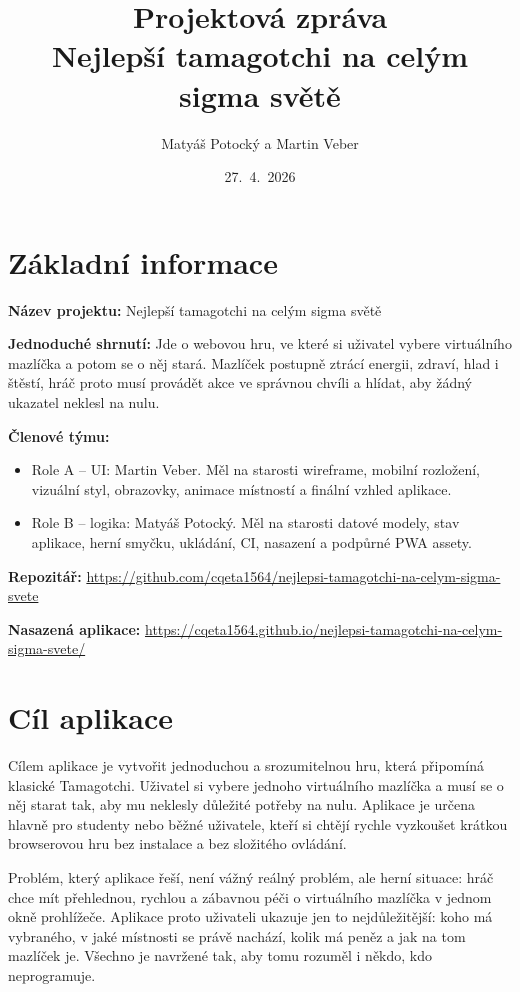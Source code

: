\documentclass[12pt,a4paper]{article}
\title{Projektová zpráva\\Nejlepší tamagotchi na celým sigma světě}
\author{Matyáš Potocký a Martin Veber}
\date{27.~4.~2026}
\begin{document}
\maketitle
\tableofcontents
\newpage

\section{Základní informace}

\textbf{Název projektu:} Nejlepší tamagotchi na celým sigma světě

\textbf{Jednoduché shrnutí:} Jde o webovou hru, ve které si uživatel vybere virtuálního mazlíčka a potom se o něj stará. Mazlíček postupně ztrácí energii, zdraví, hlad i štěstí, hráč proto musí provádět akce ve správnou chvíli a hlídat, aby žádný ukazatel neklesl na nulu.

\textbf{Členové týmu:}
\begin{itemize}[leftmargin=2em]
  \item Role A -- UI: Martin Veber. Měl na starosti wireframe, mobilní rozložení, vizuální styl, obrazovky, animace místností a finální vzhled aplikace.
  \item Role B -- logika: Matyáš Potocký. Měl na starosti datové modely, stav aplikace, herní smyčku, ukládání, CI, nasazení a podpůrné PWA assety.
\end{itemize}

\textbf{Repozitář:} \url{https://github.com/cqeta1564/nejlepsi-tamagotchi-na-celym-sigma-svete}

\textbf{Nasazená aplikace:} \url{https://cqeta1564.github.io/nejlepsi-tamagotchi-na-celym-sigma-svete/}

\section{Cíl aplikace}

Cílem aplikace je vytvořit jednoduchou a srozumitelnou hru, která připomíná klasické Tamagotchi. Uživatel si vybere jednoho virtuálního mazlíčka a musí se o něj starat tak, aby mu neklesly důležité potřeby na nulu. Aplikace je určena hlavně pro studenty nebo běžné uživatele, kteří si chtějí rychle vyzkoušet krátkou browserovou hru bez instalace a bez složitého ovládání.

Problém, který aplikace řeší, není vážný reálný problém, ale herní situace: hráč chce mít přehlednou, rychlou a zábavnou péči o virtuálního mazlíčka v jednom okně prohlížeče. Aplikace proto uživateli ukazuje jen to nejdůležitější: koho má vybraného, v jaké místnosti se právě nachází, kolik má peněz a jak na tom mazlíček je. Všechno je navržené tak, aby tomu rozuměl i někdo, kdo neprogramuje.
\end{document}
